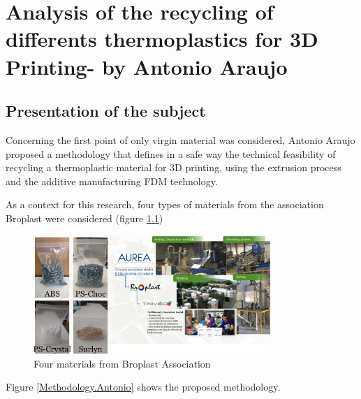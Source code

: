 \chapter{Analysis of the recycling of differents thermoplastics for 3D Printing- by Antonio Araujo}


\section{Presentation of the subject}

Concerning the first point of only virgin material was considered, Antonio Araujo proposed a methodology that defines in a safe way the technical feasibility of recycling a thermoplastic material for 3D printing, using the extrusion process and the additive manufacturing FDM technology.

As a context for this research, four types of materials from the association Broplast were considered (figure \ref{Context.Antonio})

\begin{figure}[H]
	\centering
	\includegraphics[width=0.8\textwidth]{Figures/Antonio/Context.png}
	\caption{Four materials from Broplast Association}
	\label{Context.Antonio}
\end{figure}


Figure \ref{Methodology.Antonio} shows the proposed methodology.

